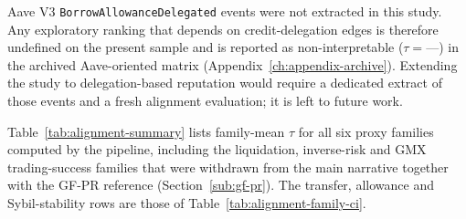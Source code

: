 


Aave V3 \texttt{BorrowAllowanceDelegated} events were not extracted in this study. Any exploratory ranking that depends on credit-delegation edges is therefore undefined on the present sample and is reported as non-interpretable ($\tau = \text{---}$) in the archived Aave-oriented matrix (Appendix~\ref{ch:appendix-archive}). Extending the study to delegation-based reputation would require a dedicated extract of those events and a fresh alignment evaluation; it is left to future work.


Table~\ref{tab:alignment-summary} lists family-mean $\tau$ for all six proxy families computed by the pipeline, including the liquidation, inverse-risk and GMX trading-success families that were withdrawn from the main narrative together with the GF-PR reference (Section~\ref{sub:gf-pr}). The transfer, allowance and Sybil-stability rows are those of Table~\ref{tab:alignment-family-ci}.




\begin{table}[htbp]
\centering
\caption{Default parameters used in the primary evaluation.}
\label{tab:parameter-summary}
\end{table}

